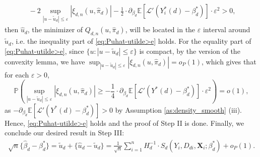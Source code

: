 \documentclass[11pt]{article}
\numberwithin{equation}{section}
\begin{document}
\begin{align}\
	-2\sup_{|u-\widetilde{u}_d|\leq \varepsilon}|\xi_{d,n}(u,\widehat{\pi}_d)|-\frac{1}{2}\cdot \partial_{\beta_d}\mathbb{E}[\mathcal{L}'(Y_i^*(d)-\beta_d^*)]\cdot \varepsilon^2>0,
\end{align}
then $\widehat{u}_d$, the minimizer of $Q_{d,n}(u,\widehat{\pi}_d)$, will be located in the $\varepsilon$ interval around $\widetilde{u}_d$, i.e. the inequality part of \eqref{eq:Puhat-utilde>e} holds.  For the equality part of \eqref{eq:Puhat-utilde>e}, since $\{u:|u-\widetilde{u}_d|\leq \varepsilon\}$ is compact, by the \cite{hjort2011asymptotics} version of the convexity lemma, we have $\sup_{|u-\widetilde{u}_d|\leq \varepsilon}|\xi_{d,n}(u,\widehat{\pi}_d)|=o_P(1)$, which gives that for each $\varepsilon>0$,
$$\mathbb{P}\left(\sup_{|u-\widetilde{u}_d|\leq \varepsilon}|\xi_{d,n}(u,\widehat{\pi}_d)|\geq -\frac{1}{4}\cdot \partial_{\beta_d}\mathbb{E}[\mathcal{L}'(Y^*(d)-\beta_d^*)] \cdot \varepsilon^2 \right)=o(1),$$
as $-\partial_{\beta_d}\mathbb{E}[\mathcal{L}'(Y^*(d)-\beta_d^*)]>0$ by Assumption \ref{as:density_smooth} (iii). Hence, \eqref{eq:Puhat-utilde>e} holds and the proof of Step II is done.  Finally, we  conclude our desired result in Step III:
\begin{align*}
	\sqrt{n}\{\widehat{\beta}_d-\beta_d^*\}=\widetilde{u}_d+\{\widehat{u}_d-\widetilde{u}_d\}=\frac{1}{\sqrt{n}}\sum_{i=1}^nH_d^{-1}\cdot S_d(Y_i,D_{di},\boldsymbol{X}_{i};\beta_d^*)+o_P(1).
\end{align*}


\end{document}
